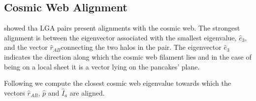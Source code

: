 \documentclass[useAMS,usenatbib,usegraphicx]{mn2e}
\begin{document}
\subsection{Cosmic Web Alignment}
\label{sub:webalignment}

\cite{2015ApJ...799...45F} showed tha LGA pairs present alignments
with the cosmic web.
The strongest alignment is between the eigenvector associated  with the smallest
eigenvalue, $\hat{e}_3$, and the vector $\hat{r}_{AB} $connecting the two halos in
the pair. 
The eigenvector $\hat{e}_3$ indicates the direction along
which the cosmic web filament lies and in the case of being on a local
sheet it is a vector lying on the pancakes' plane. 

Following \cite{2014MNRAS.443.1090F} we compute the closest cosmic web
eigenvalue  towards which the vectors $\hat{r}_{AB}$, $\hat{p}$ and
$\hat{I}_a$ are aligned. 







\end{document}
